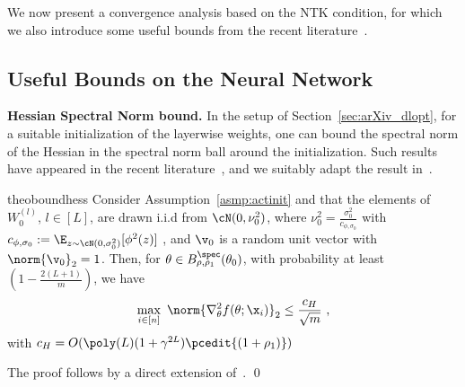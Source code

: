 
We now present a convergence analysis based on the NTK condition, for which we also introduce some useful bounds from the recent literature~\cite{CL-LZ-MB:20,CL-LZ-MB:21,AB-PCV-LZ-MB:22}.



\subsection{Useful Bounds on the Neural Network}

{\bf Hessian Spectral Norm bound.} In the setup of Section~\ref{sec:arXiv_dlopt}, for a suitable initialization of the layerwise weights, one can bound the spectral norm of the Hessian in the spectral norm ball around the initialization. Such results have appeared in the recent literature~\citep{CL-LZ-MB:20,CL-LZ-MB:21,AB-PCV-LZ-MB:22}, and we suitably adapt the result in~\citep[Theorem~4.1]{AB-PCV-LZ-MB:22}.
%
\begin{restatable}{theo}{boundhess}
\label{theo:bound-Hess}
Consider Assumption~\ref{asmp:actinit} and that the elements of $W_0^{(l)}$, $l\in[L]$, are drawn i.i.d from $\cN(0,\nu_0^2)$, where $\nu_0^2 = \frac{\sigma_0^2}{c_{\phi,\sigma_0}}$ with $c_{\phi,\sigma_0} := \E_{z \sim \cN(0,\sigma_0^2)}[\phi^2(z)]$ , and $\v_0$ is a random unit vector with $\norm{\v_0}_2=1$. Then, for $\theta \in B_{\rho,\rho_1}^{\spec}(\theta_0)$, 
with probability at least $(1-\frac{2(L+1)}{m})$, we have 
\begin{equation}
\label{eq:bound_Hessian}
   \max_{i \in [n]} ~\norm{ \nabla^2_\theta f(\theta;\x_i)}_2 \leq \frac{c_H}{\sqrt{m}}~,
\end{equation}
with $c_H = O(\poly(L)(1+\gamma^{2L})\pcedit{(1+\rho_1)})$ 
\end{restatable}
%
\proof The proof follows by a direct extension of~\citep[Theorem~4.1]{AB-PCV-LZ-MB:22}.   %
\qed 

